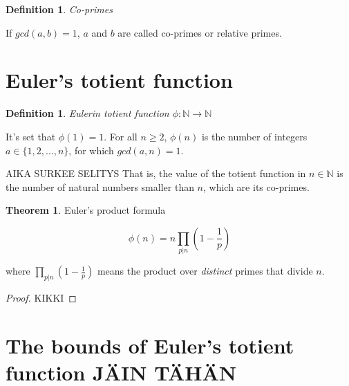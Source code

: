\documentclass{article}
\theoremstyle{definition}
\newtheorem{definition}[subsection]{Definition}
\newtheorem{theorem}[subsection]{Theorem}
\begin{document}
\begin{definition}{\emph{Co-primes}}

If $gcd(a,b) = 1$, $a$ and $b$ are called co-primes or relative primes.

\end{definition}

\section{Euler's totient function}


\begin{definition}{\emph{Eulerin totient function $\phi: \mathbb{N} \rightarrow \mathbb{N}$}}

It's set that $\phi(1) = 1$. For all $n \geq 2$, $\phi(n)$ is the number of integers $a \in \{1,2,...,n\}$, for which $gcd(a,n) = 1$.

AIKA SURKEE SELITYS
That is, the value of the totient function in $n \in \mathbb{N}$ is the number of natural numbers smaller than $n$, which are its co-primes.


\end{definition}

\newpage

\begin{theorem}{Euler's product formula}

\begin{equation*}
    \phi(n) = n \prod_{p \vert n} (1 - \frac{1}{p})
\end{equation*}

where $\prod_{p \vert n} (1 - \frac{1}{p})$ means the product over \emph{distinct} primes that divide $n$.

\begin{proof}

KIKKI

\end{proof}

\end{theorem}

\section{The bounds of Euler's totient function JÄIN TÄHÄN}
\end{document}
